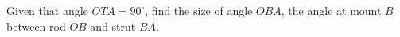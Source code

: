 \begin{question}
\begin{center}
\begin{tikzpicture}[scale=2.2]
\end{tikzpicture}
\end{center}

\noindent Given that angle $OTA = 90^\circ$, find the size of angle $OBA$, the angle at mount $B$ between rod $OB$ and strut $BA$.

\vspace{6cm}

\begin{flushright}
\end{flushright}
\end{question}
